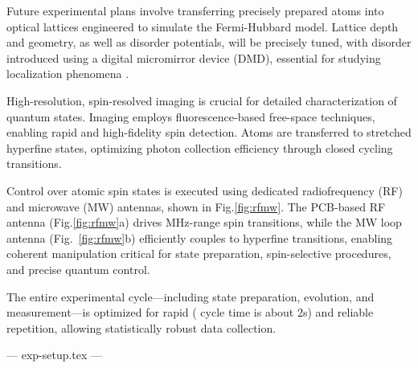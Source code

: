 Future experimental plans involve transferring precisely prepared atoms into optical lattices engineered to simulate the Fermi-Hubbard model. Lattice depth and geometry, as well as disorder potentials, will be precisely tuned, with disorder introduced using a digital micromirror device (DMD), essential for studying localization phenomena \cite{huang_construction_2024}.

High-resolution, spin-resolved imaging is crucial for detailed characterization of quantum states. Imaging employs fluorescence-based free-space techniques, enabling rapid and high-fidelity spin detection. Atoms are transferred to stretched hyperfine states, optimizing photon collection efficiency through closed cycling transitions.

Control over atomic spin states is executed using dedicated radiofrequency (RF) and microwave (MW) antennas, shown in Fig.\ref{fig:rfmw}. The PCB-based RF antenna (Fig.\ref{fig:rfmw}a) drives MHz-range spin transitions, while the MW loop antenna (Fig.~\ref{fig:rfmw}b) efficiently couples to hyperfine transitions, enabling coherent manipulation critical for state preparation, spin-selective procedures, and precise quantum control.

The entire experimental cycle—including state preparation, evolution, and measurement—is optimized for rapid ( cycle time is about 2s) and reliable repetition, allowing statistically robust data collection. 

--- exp-setup.tex ---

